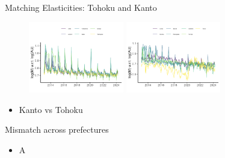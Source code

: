 \documentclass[aspectratio=169]{beamer}
\begin{document}
\begin{frame}{Matching Elasticities: Tohoku and Kanto}
\begin{figure}[!ht]
  \begin{center}
  \includegraphics[width = 0.37\textwidth]
  {figuretable/elasticity_unemployed_month_aggregate_tohoku.png}
  \includegraphics[width = 0.37\textwidth]
  {figuretable/elasticity_unemployed_month_aggregate_kanto.png}
  \end{center}
  \footnotesize
\end{figure} 
\begin{itemize}
    \item Kanto vs Tohoku
\end{itemize}
\end{frame}

\begin{frame}{Mismatch across prefectures}
\begin{itemize}
    \item A
\end{itemize}
\end{frame}
\end{document}
